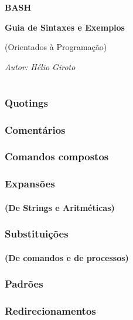 \documentclass[aspectratio=1610]{beamer}
\begin{document}
\section [Capa]{}
\begin{frame}

\Huge \textbf{BASH} \vspace{0.5cm}

\large
\textbf{Guia de Sintaxes e Exemplos}

(Orientados à Programação)\vspace{1.2cm}


\begin{flushright}
	\scriptsize{\textit{Autor: Hélio Giroto}}
\end{flushright}

  
\end{frame}


\section [Bash e etc...]{}
\begin{frame}
  \frametitle{Quotings}
  \framesubtitle{}

\end{frame}


\begin{frame}
  \frametitle{Comentários}
  \framesubtitle{}

\end{frame}


\begin{frame}
  \frametitle{Comandos compostos}
  \framesubtitle{}

\end{frame}


\begin{frame}
  \frametitle{Expansões}
  \framesubtitle{(De Strings e Aritméticas)}

\end{frame}


\begin{frame}
  \frametitle{Substituições}
  \framesubtitle{(De comandos e de processos)}

\end{frame}


\begin{frame}
  \frametitle{Padrões}
  \framesubtitle{}

\end{frame}


\begin{frame}
  \frametitle{Redirecionamentos}
  \framesubtitle{}

\end{frame}
\end{document}
